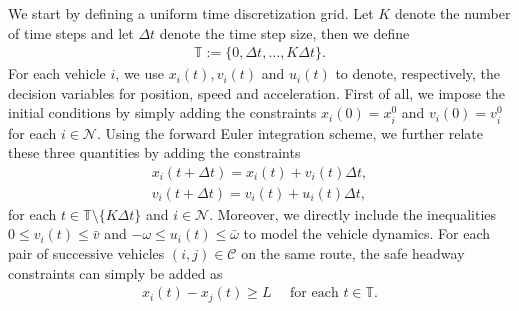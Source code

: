 \documentclass{report}
\theoremstyle{definition}
\theoremstyle{plain}
\begin{document}
We start by defining a uniform time discretization grid. Let $K$ denote the
number of time steps and let $\Delta t$ denote the time step size, then we
define
\begin{align*}
  \mathbb{T} := \{0, \Delta t, \dots, K \Delta t\} .
\end{align*}
%
For each vehicle $i$, we use $x_{i}(t), v_{i}(t)$ and $u_{i}(t)$ to denote,
respectively, the decision variables for position, speed and acceleration.
%
First of all, we impose the initial conditions by simply adding the constraints
$x_{i}(0) = x_{i}^{0}$ and $v_{i}(0) = v_{i}^{0}$ for each $i \in \mathcal{N}$.
%
Using the forward Euler integration scheme, we further relate these three
quantities by adding the constraints
\begin{align*}
  x_{i}(t + \Delta t) = x_{i}(t) + v_{i}(t) \Delta t , \\
  v_{i}(t + \Delta t) = v_{i}(t) + u_{i}(t) \Delta t ,
\end{align*}
for each $t \in \mathbb{T} \setminus \{K\Delta t\}$ and $i \in \mathcal{N}$. Moreover, we directly include
the inequalities $0 \leq v_{i}(t) \leq \bar{v}$ and
${-\omega} \leq u_{i}(t) \leq \bar{\omega}$ to model the vehicle dynamics.
%
For each pair of successive vehicles $(i, j) \in \mathcal{C}$ on the same route,
the safe headway constraints can simply be added as
\begin{align*}
  x_{i}(t) - x_{j}(t) \geq L \quad \text{ for each } t \in \mathbb{T}.
\end{align*}
\end{document}
